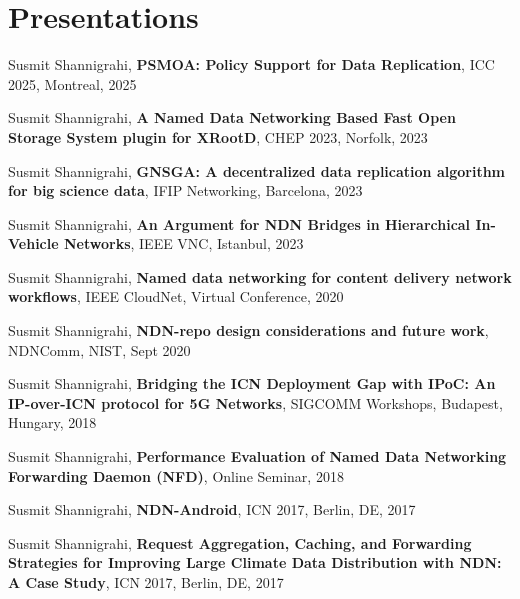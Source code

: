 
\section{Presentations}

\begin{etaremune}


\item Susmit Shannigrahi, \textbf{PSMOA: Policy Support for Data Replication}, ICC 2025, Montreal, 2025

\item Susmit Shannigrahi, \textbf{A Named Data Networking Based Fast Open Storage System plugin for XRootD}, CHEP 2023, Norfolk, 2023

\item Susmit Shannigrahi, \textbf{GNSGA: A decentralized data replication algorithm for big science data}, IFIP Networking, Barcelona, 2023

\item Susmit Shannigrahi, \textbf{An Argument for NDN Bridges in Hierarchical In-Vehicle Networks}, IEEE VNC, Istanbul, 2023



\item Susmit Shannigrahi, \textbf{Named data networking for content delivery network workflows}, IEEE CloudNet, Virtual Conference, 2020

\item Susmit Shannigrahi, \textbf{NDN-repo design considerations and future work}, NDNComm, NIST, Sept 2020


\item Susmit Shannigrahi, \textbf{Bridging the ICN Deployment Gap with IPoC: An IP-over-ICN protocol for 5G Networks}, SIGCOMM Workshops, Budapest, Hungary, 2018

\item Susmit Shannigrahi, \textbf{Performance Evaluation of Named Data Networking Forwarding Daemon (NFD)}, Online Seminar, 2018

\item Susmit Shannigrahi, \textbf{NDN-Android}, ICN 2017, Berlin, DE, 2017

\item Susmit Shannigrahi, \textbf{Request Aggregation, Caching, and Forwarding Strategies for Improving Large Climate Data Distribution with NDN: A Case Study}, ICN 2017, Berlin, DE, 2017


\end{etaremune}
